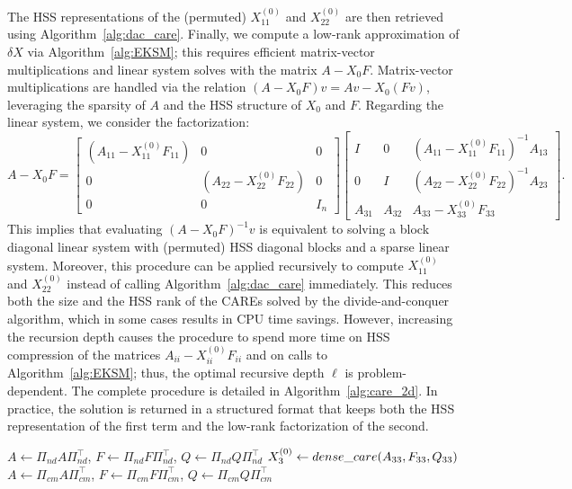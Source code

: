 \documentclass[a4paper,10pt]{article}
\begin{document}
{The HSS representations of the (permuted) $X_{11}^{(0)}$ and $X_{22}^{(0)}$ are then retrieved using Algorithm~\ref{alg:dac_care}. Finally, we compute a low-rank approximation of $\delta X$ via Algorithm~\ref{alg:EKSM}; this requires efficient matrix-vector multiplications and linear system solves with the matrix $A-X_0F$. Matrix-vector multiplications are handled via the relation $(A-X_0F)v=Av - X_0(F v)$, leveraging the sparsity of $A$ and the HSS structure of $X_0$ and $F$. Regarding the linear system, we consider the factorization:
$$
A-X_0F=\begin{bmatrix}
	(A_{11}-X_{11}^{(0)}F_{11})&0&0\\
	0&(A_{22}-X_{22}^{(0)}F_{22})&0\\
	0&0&I_n	
\end{bmatrix}\begin{bmatrix}
	I&0&(A_{11}-X_{11}^{(0)}F_{11})^{-1}A_{13}\\
	0&I&(A_{22}-X_{22}^{(0)}F_{22})^{-1}A_{23}\\
	A_{31}&A_{32}&A_{33}-X_{33}^{(0)}F_{33}
\end{bmatrix}.
$$    
This implies that evaluating $(A-X_0F)^{-1}v$ is equivalent to solving a block diagonal linear system with (permuted) HSS diagonal blocks and a sparse linear system. Moreover, this procedure can be applied recursively to compute $X_{11}^{(0)}$ and $X_{22}^{(0)}$ instead of calling Algorithm~\ref{alg:dac_care} immediately. This reduces both the size and the HSS rank of the CAREs solved by the divide-and-conquer algorithm, which in some cases results in CPU time savings. However, increasing the recursion depth causes the procedure to spend more time on HSS compression of the matrices $A_{ii}-X_{ii}^{(0)}F_{ii}$ and on calls to Algorithm~\ref{alg:EKSM}; thus, the optimal recursive depth $\ell$ is problem-dependent. The complete procedure is detailed in Algorithm~\ref{alg:care_2d}. In practice, the solution is returned in a structured format that keeps both the HSS representation of the first term and the low-rank factorization of the second.
\begin{algorithm}
	\caption{CARE solver in the case where $A$ is Laplace-like sparse}\label{alg:care_2d}
	\begin{algorithmic}[1]
		\State $A\gets \Pi_{nd}A\Pi_{nd}^\top$, $F\gets\Pi_{nd}F\Pi_{nd}^\top$, $Q\gets\Pi_{nd}Q\Pi_{nd}^\top$
		\State $X_3^{(0)}\gets\textsc{dense\_care}(A_{33}, F_{33}, Q_{33})$
		\State
		$A\gets \Pi_{cm}A\Pi_{cm}^\top$, $F\gets\Pi_{cm}F\Pi_{cm}^\top$, $Q\gets\Pi_{cm}Q\Pi_{cm}^\top$

\end{algorithmic}
\end{algorithm}}
\end{document}
